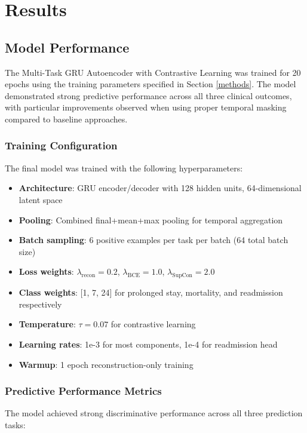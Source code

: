 \documentclass[11pt]{article}
\begin{document}
\section{Results}

\subsection{Model Performance}

The Multi-Task GRU Autoencoder with Contrastive Learning was trained for 20 epochs using the training parameters specified in Section \ref{methods}. The model demonstrated strong predictive performance across all three clinical outcomes, with particular improvements observed when using proper temporal masking compared to baseline approaches.

\subsubsection{Training Configuration}

The final model was trained with the following hyperparameters:
\begin{itemize}
    \item \textbf{Architecture}: GRU encoder/decoder with 128 hidden units, 64-dimensional latent space
    \item \textbf{Pooling}: Combined final+mean+max pooling for temporal aggregation
    \item \textbf{Batch sampling}: 6 positive examples per task per batch (64 total batch size)
    \item \textbf{Loss weights}: $\lambda_{\text{recon}} = 0.2$, $\lambda_{\text{BCE}} = 1.0$, $\lambda_{\text{SupCon}} = 2.0$
    \item \textbf{Class weights}: [1, 7, 24] for prolonged stay, mortality, and readmission respectively
    \item \textbf{Temperature}: $\tau = 0.07$ for contrastive learning
    \item \textbf{Learning rates}: 1e-3 for most components, 1e-4 for readmission head
    \item \textbf{Warmup}: 1 epoch reconstruction-only training
\end{itemize}

\subsubsection{Predictive Performance Metrics}

The model achieved strong discriminative performance across all three prediction tasks:
\end{document}
